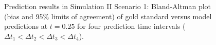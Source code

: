 \documentclass[12pt]{article}
\begin{document}
\begin{figure}[H]
\centering
{}
{}

  \caption{Prediction results in Simulation II Scenario 1: Bland-Altman plot (bias and 95\% limits of agreement) of gold standard versus model predictions at $t=0.25$ for four prediction time intervals ($\Delta t_1 < \Delta t_2 < \Delta t_3 < \Delta t_4$).}
  \label{plot:sim2fig1}
\end{figure}
\end{document}
